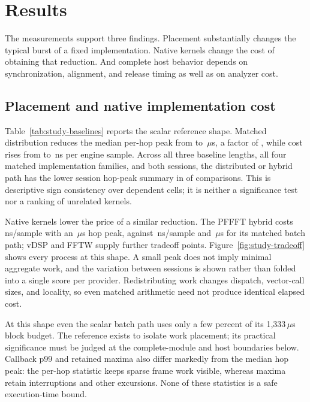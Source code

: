 \section{Results}
\label{sec:comparison-results}
The measurements support three findings. Placement substantially changes the
typical burst of a fixed implementation. Native kernels change the cost of
obtaining that reduction. And complete host behavior depends on
synchronization, alignment, and release timing as well as on analyzer cost.

\subsection{Placement and native implementation cost}
Table~\ref{tab:study-baselines} reports the scalar reference shape. Matched
distribution reduces the median per-hop peak from \StudyBatchPeak{} to
\StudyCorePeak\,$\mu$s, a factor of \StudyPlacementRatio, while cost rises
from \StudyBatchCost{} to \StudyCoreCost\,ns per engine sample. Across all
three baseline lengths, all four matched implementation families, and both
sessions, the distributed or hybrid path has the lower session hop-peak
summary in \StudyPlacementSigns{} of \StudyPlacementComparisons{} comparisons.
This is descriptive sign consistency over dependent cells; it is neither a
significance test nor a ranking of unrelated kernels.



Native kernels lower the price of a similar reduction. The PFFFT hybrid costs
\StudyPffftHybridCost\,ns/sample with an \StudyPffftHybridPeak\,$\mu$s hop
peak, against \StudyPffftBatchCost\,ns/sample and \StudyPffftBatchPeak\,$\mu$s
for its matched batch path; vDSP and FFTW supply further tradeoff points.
Figure~\ref{fig:study-tradeoff} shows every process at this shape. A small
peak does not imply minimal aggregate work, and the variation between sessions
is shown rather than folded into a single score per provider. Redistributing
work changes dispatch, vector-call sizes, and locality, so even matched
arithmetic need not produce identical elapsed cost.



At this shape even the scalar batch path uses only a few percent of its
1,333\,$\mu$s block budget. The reference exists to isolate work placement;
its practical significance must be judged at the complete-module and host
boundaries below. Callback p99 and retained maxima also differ markedly from
the median hop peak: the per-hop statistic keeps sparse frame work visible,
whereas maxima retain interruptions and other excursions. None of these
statistics is a safe execution-time bound.

